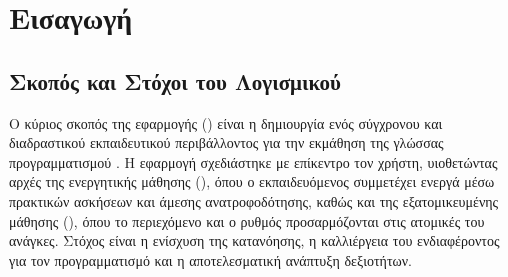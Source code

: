 \section{Εισαγωγή}
\label{sec:eisagogi}

\subsection{Σκοπός και Στόχοι του Λογισμικού}
\label{sec:skopos_stoxoi}
Ο κύριος σκοπός της εφαρμογής () είναι η δημιουργία ενός σύγχρονου και διαδραστικού εκπαιδευτικού περιβάλλοντος για την εκμάθηση της γλώσσας προγραμματισμού . Η εφαρμογή σχεδιάστηκε με επίκεντρο τον χρήστη, υιοθετώντας αρχές της ενεργητικής μάθησης (), όπου ο εκπαιδευόμενος συμμετέχει ενεργά μέσω πρακτικών ασκήσεων και άμεσης ανατροφοδότησης, καθώς και της εξατομικευμένης μάθησης (), όπου το περιεχόμενο και ο ρυθμός προσαρμόζονται στις ατομικές του ανάγκες. Στόχος είναι η ενίσχυση της κατανόησης, η καλλιέργεια του ενδιαφέροντος για τον προγραμματισμό και η αποτελεσματική ανάπτυξη δεξιοτήτων.

